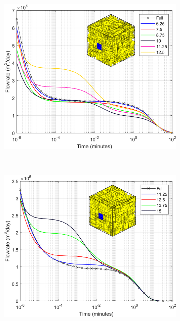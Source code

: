 \documentclass[main.tex]{subfiles}
\begin{document}
\begin{figure}[ht]
\begin{subfigure}{0.3\textwidth}
		\end{subfigure}
		\begin{subfigure}{0.3\textwidth}
			\includegraphics[width=\textwidth]{DD_main/Plot_Drawdown_Case_05_BCinset.png}
			\label{fig:DD_C}
		\end{subfigure}
		\\
		\begin{subfigure}{0.3\textwidth}
			\includegraphics[width=\textwidth]{DD_main/Plot_Drawdown_Case_07_BCinset.png}

\end{subfigure}
\end{figure}
\end{document}
